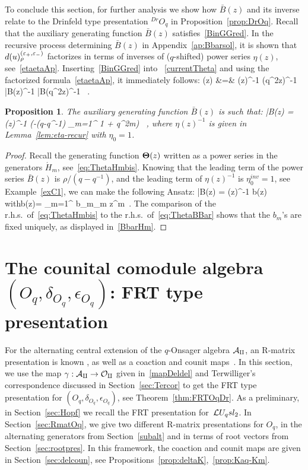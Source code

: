 \documentclass[11pt]{amsart}
\numberwithin{equation}{section}
\newtheorem{prop}[thm]{Proposition}
\numberwithin{equation}{section}
\begin{document}
To conclude this section, for further analysis we show how ${\bar B}(z)$ and its inverse relate to the Drinfeld type presentation $^{Dr}O_q$ in Proposition~\ref{prop:DrOq}.
Recall that the auxiliary generating function $\bar B(z)$ satisfies~\eqref{BinGGred}. In the recursive process determining $\bar B(z)$ in Appendix~\ref{ap:Bbarsol}, it is shown that $d(u)^{(\varepsilon_+,\varepsilon_-)}_{\rho}$ factorizes in terms of inverses of ($q$-shifted) power series $\eta(z)$, see~\eqref{etaetaAp}. Inserting~\eqref{BinGGred} into  ~\eqref{currentTheta} and using the factorized formula~\eqref{etaetaAp}, it immediately follows: 
	\beqa
	{\bf \Theta}(z) &=&   \eta(z)^{-1} \eta(q^2z)^{-1} {\bar B}(z)^{-1} {\bar B}(q^2z)^{-1}\label{eq:ThetaBBar}
	 \ .
	\eeqa
\begin{prop}\label{prop:BbarH} The auxiliary generating function ${\bar B}(z)$ is such that:
	\beqa
	{\bar B}(z) =  \eta(z)^{-1} \exp\left(-(q-q^{-1}) \sum_{m=1}^{\infty}  {1 + q^{2m}}\right) \ ,\label{BbarHm} 
	\eeqa
	where $\eta(z)^{-1}$ is given in Lemma~\ref{lem:eta-recur} with $\eta_0=1$.
\end{prop}
\begin{proof} Recall the generating function ${\bf \Theta}(z)$ written as a power series in the generators ${\acute H}_m$, see~\eqref{eq:ThetaHmbis}. 
Knowing that the leading  term of the power series ${\bar B}(z)$ is $\rho/(q-q^{-1})$, and  the leading term of $\eta(z)^{-1}$ is $\eta^{inv}_0=1$, see Example~\ref{exC1}, we can make the following Ansatz:
\beqa
{\bar B}(z) =  \eta(z)^{-1} \exp b(z) \quad \mbox{with}\quad  b(z)= \sum_{m=1}^{\infty} b_m_m z^m\ . 
\eeqa
The comparison of the r.h.s.\ of~\eqref{eq:ThetaHmbis} to the r.h.s.\ of~\eqref{eq:ThetaBBar} shows that the $b_m$'s are fixed uniquely, as displayed in~\eqref{BbarHm}.
\end{proof}

\section{The counital comodule algebra $(O_q,\delta_{O_q},\epsilon_{O_q})$: FRT type presentation}\label{sec:FRTOq}
For the alternating central extension of the $q$-Onsager algebra $\cal A_q$, an R-matrix presentation is known \cite{BSh1,BasBel}, as well as a coaction and counit maps~\cite{LBG,BGL25}. In this section, we use the map $\gamma:\cal A_q \rightarrow O_q$ given in~\eqref{mapDeldel} and Terwilliger's correspondence discussed in Section~\ref{sec:Tercor} to get the FRT type presentation for $(O_q,\delta_{O_q},\epsilon_{O_q})$, see Theorem~\ref{thm:FRTOqDr}. As a preliminary, in Section~\ref{sec:Hopf} we recall the FRT presentation for~$\mathcal{L} U_q sl_2$.
In Section~\ref{sec:RmatOq}, we give two different R-matrix presentations for $O_q$, in the alternating generators from Section~\ref{subalt} and in terms of root vectors  from Section~\ref{sec:rootpres}. In this framework, the coaction and counit maps are given in Section~\ref{sec:delcoun}, see Propositions~\ref{prop:deltaK},~\ref{prop:Kaq-Km}.
\end{document}
